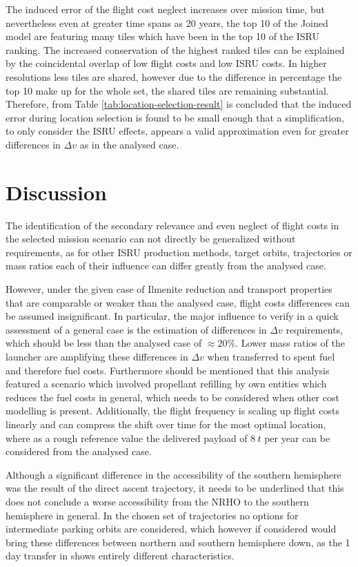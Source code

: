 \documentclass[utf8]{FrontiersinHarvard} %
\begin{document}
The induced error of the flight cost neglect increases over mission time, but nevertheless even at greater time spans as 20 years, the top 10 of the Joined model are featuring many tiles which have been in the top 10 of the ISRU ranking.
The increased conservation of the highest ranked tiles can be explained by the coincidental overlap of low flight costs and low ISRU costs.
In higher resolutions less tiles are shared, however due to the difference in percentage the top 10 make up for the whole set, the shared tiles are remaining substantial.
Therefore, from Table \ref{tab:location-selection-result} is concluded that the induced error during location selection is found to be small enough that a simplification, to only consider the ISRU effects, appears a valid approximation even for greater differences in $\Delta v$ as in the analysed case.


\section{Discussion}
\label{sec:Discussion}

The identification of the secondary relevance and even neglect of flight costs in the selected mission scenario can not directly be generalized without requirements, as for other ISRU production methods, target orbits, trajectories or mass ratios each of their influence can differ greatly from the analysed case.

However, under the given case of Ilmenite reduction and transport properties that are comparable or weaker than the analysed case, flight costs differences can be assumed insignificant.
In particular, the major influence to verify in a quick assessment of a general case is the estimation of differences in $\Delta v$ requirements, which should be less than the analysed case of $\approx 20 \%$. Lower mass ratios of the launcher are amplifying these differences in $\Delta v$ when transferred to spent fuel and therefore fuel costs. 
Furthermore should be mentioned that this analysis featured a scenario which involved propellant refilling by own entities which reduces the fuel costs in general, which needs to be considered when other cost modelling is present.
Additionally, the flight frequency is scaling up flight costs linearly and can compress the shift over time for the most optimal location, where as a rough reference value the delivered payload of $8 \ t$ per year can be considered from the analysed case.

Although a significant difference in the accessibility of the southern hemisphere was the result of the direct ascent trajectory, it needs to be underlined that this does not conclude a worse accessibility from the NRHO to the southern hemisphere in general. In the chosen set of trajectories no options for intermediate parking orbits are considered, which however if considered would bring these differences between northern and southern hemisphere down, as the 1 day transfer in \cite{May2020} shows entirely different characteristics.
\end{document}
